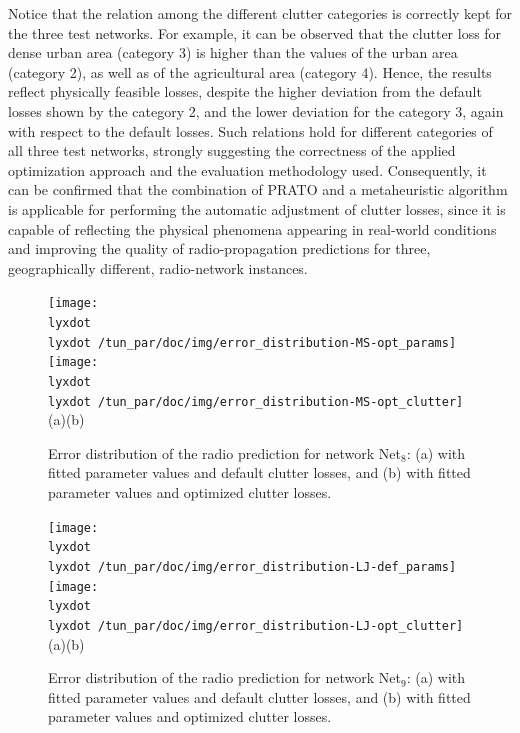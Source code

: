 Notice that the relation among the different clutter categories is
correctly kept for the three test networks. For example, it can be
observed that the clutter loss for dense urban area (category 3) is
higher than the values of the urban area (category 2), as well as
of the agricultural area (category 4). Hence, the results reflect
physically feasible losses, despite the higher deviation from the
default losses shown by the category 2, and the lower deviation for
the category 3, again with respect to the default losses. Such relations
hold for different categories of all three test networks, strongly
suggesting the correctness of the applied optimization approach and
the evaluation methodology used. Consequently, it can be confirmed
that the combination of PRATO and a metaheuristic algorithm is applicable
for performing the automatic adjustment of clutter losses, since it
is capable of reflecting the physical phenomena appearing in real-world
conditions and improving the quality of radio-propagation predictions
for three, geographically different, radio-network instances.

\begin{figure}
\centering

\texttt{[image: \\lyxdot \\lyxdot /tun\_par/doc/img/error\_distribution-MS-opt\_params]}\texttt{[image: \\lyxdot \\lyxdot /tun\_par/doc/img/error\_distribution-MS-opt\_clutter]}\\\hspace*{0.2in}(a)\hspace*{3.2in}(b)

\caption{Error distribution of the radio prediction for network Net$_{8}$:
(a) with fitted parameter values and default clutter losses, and (b)
with fitted parameter values and optimized clutter losses.\label{fig:05-Clutter_error_distribution_for_Net8}}
\end{figure}


\begin{figure}
\centering

\texttt{[image: \\lyxdot \\lyxdot /tun\_par/doc/img/error\_distribution-LJ-def\_params]}\texttt{[image: \\lyxdot \\lyxdot /tun\_par/doc/img/error\_distribution-LJ-opt\_clutter]}\\\hspace*{0.2in}(a)\hspace*{3.2in}(b)

\caption{Error distribution of the radio prediction for network Net$_{9}$:
(a) with fitted parameter values and default clutter losses, and (b)
with fitted parameter values and optimized clutter losses.\label{fig:05-Clutter_error_distribution_for_Net9}}
\end{figure}


